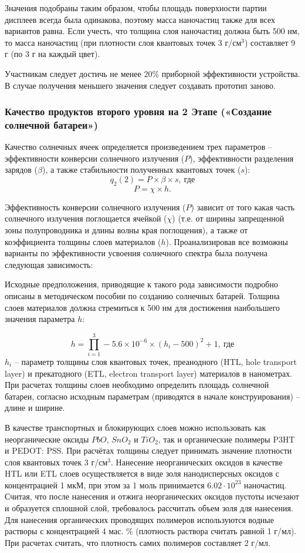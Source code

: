 Значения подобраны таким образом, чтобы площадь поверхности партии дисплеев всегда была одинакова, поэтому масса наночастиц также для всех вариантов равна. Если учесть, что толщина слоя наночастиц должна быть 500 нм, то масса наночастиц (при плотности слоя квантовых точек 3 г/см$^3$) составляет 9 г (по 3 г на каждый цвет).

Участникам следует достичь не менее 20\% приборной эффективности устройства. В случае получения меньшего значения следует создавать прототип заново.

\subsubsection*{Качество продуктов второго уровня на 2 Этапе («Создание солнечной батареи»)}

Качество солнечных ячеек определяется произведением трех параметров – эффективности конверсии солнечного излучения ($P$), эффективности разделения зарядов ($\beta$), а также стабильности полученных квантовых точек ($s$):
$$q_2 (2)=P \times  \beta \times s, \: \text{где}$$
$$P= \chi \times h.$$

Эффективность конверсии солнечного излучения ($P$) зависит от того какая часть солнечного излучения поглощается ячейкой ($\chi$) (т.е. от ширины запрещенной зоны полупроводника и длины волны края поглощения), а также от коэффициента толщины слоев материалов ($h$). Проанализировав все возможны варианты по эффективности усвоения солнечного спектра была получена следующая зависимость:

 
Исходные предположения, приводящие к такого рода зависимости подробно описаны в методическом пособии по созданию солнечных батарей. Толщина слоев материалов должна стремиться к 500 нм для достижения наибольшего значения параметра $h$:

$$h= \prod_{i=1}^3-5.6 \times 10^{-6}\times (h_i-500)^2+1, \: \text{где}$$
$h_i$ – параметр толщины слоя квантовых точек, преанодного (HTL, hole {transport} layer) и прекатодного (ETL, electron {transport} layer) материалов в нанометрах. При расчетах толщины слоев необходимо определить площадь солнечной батареи, согласно исходным параметрам (приводятся в начале конструирования) – длине и ширине.

В качестве транспортных и блокирующих слоев можно использовать как неорганические оксиды $PbO$, $SnO_2$ и $TiO_2$, так и органические полимеры P3HT и PEDOT: PSS. При расчётах толщины следует принимать значение плотности слоя квантовых точек 3 г/см$^3$. Нанесение неорганических оксидов в качестве HTL или ETL слоев осуществляется в виде золя нанодисперсных оксидов с концентрацией 1 мкМ, при этом за 1 моль принимается $6.02 \cdot 10^{23}$ наночастиц. Считая, что после нанесения и отжига неорганических оксидов пустоты исчезают и образуется сплошной слой, требовалось рассчитать объем золя для нанесения. Для нанесения органических проводящих полимеров используются водные растворы с концентрацией 4 мас. \% (плотность раствора считать равной 1 г/мл). При расчетах считать, что плотность самих полимеров составляет 2 г/мл.

